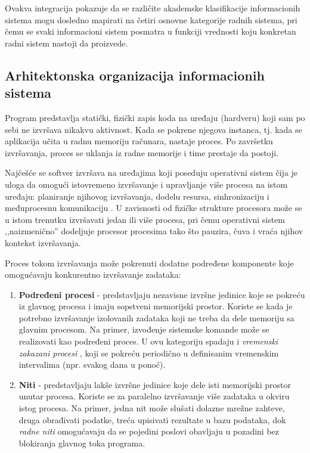 Ovakva integracija pokazuje da se različite akademske klasifikacije informacionih sistema mogu dosledno mapirati na četiri osnovne kategorije radnih sistema, pri čemu se svaki informacioni sistem posmatra u funkciji vrednosti koju konkretan radni sistem nastoji da proizvede.

\subsection{Arhitektonska organizacija informacionih sistema}\label{sec:arhitektonska-organizacija}

Program predstavlja statički, fizički zapis koda na uređaju (hardveru) koji sam po sebi ne izvršava nikakvu aktivnost. Kada se pokrene njegova instanca, tj. kada se aplikacija učita u radnu memoriju računara, nastaje proces. Po završetku izvršavanja, proces se uklanja iz radne memorije i time prestaje da postoji.

Najčešće se softver izvršava na uređajima koji poseduju operativni sistem \cite{tanenbaum2015modern} čija je uloga da omogući istovremeno izvršavanje i upravljanje više procesa na istom uređaju: planiranje njihovog izvršavanja, dodelu resursa, sinhronizaciju i međuprocesnu komunikaciju . U zavisnosti od fizičke strukture procesora može se u istom trenutku izvršavati jedan ili više procesa, pri čemu operativni sistem ,,naizmenično'' dodeljuje procesor procesima tako što pauzira, čuva i vraća njihov kontekst izvršavanja.

Proces tokom izvršavanja može pokrenuti dodatne podređene komponente koje omogućavaju konkurentno izvršavanje zadataka:
\begin{enumerate}
\item \textbf{Podređeni procesi}  - predstavljaju nezavisne izvršne jedinice koje se pokreću iz glavnog procesa i imaju sopstveni memorijski prostor. Koriste se kada je potrebno izvršavanje izolovanih zadataka koji ne treba da dele memoriju sa glavnim procesom. Na primer, izvođenje sistemske komande može se realizovati kao podređeni proces. U ovu kategoriju spadaju i \textit{vremenski zakazani procesi} , koji se pokreću periodično u definisanim vremenskim intervalima (npr. svakog dana u ponoć).
    
\item \textbf{Niti}  - predstavljaju lakše izvršne jedinice koje dele isti memorijski prostor unutar procesa. Koriste se za paralelno izvršavanje više zadataka u okviru istog procesa. Na primer, jedna nit može slušati dolazne mrežne zahteve, druga obrađivati podatke, treća upisivati rezultate u bazu podataka, dok \textit{radne niti}  omogućavaju da se pojedini poslovi obavljaju u pozadini bez blokiranja glavnog toka programa.
\end{enumerate}

